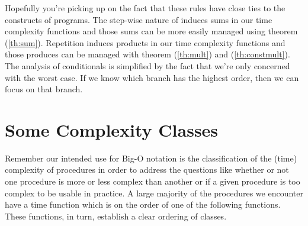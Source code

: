 \documentclass[]{tufte-handout}
\begin{document}
Hopefully you're picking up on the fact that these rules have close ties to the constructs of programs. The step-wise nature of induces sums in our time complexity functions and those sums can be more easily managed using theorem (\ref{th:sum}). Repetition induces products in our time complexity functions and those produces can be managed with theorem (\ref{th:mult}) and (\ref{th:constmult}). The analysis of conditionals is simplified by the fact that we're only concerned with the worst case. If we know which branch has the highest order, then we can focus on that branch.

\section{Some Complexity Classes}

Remember our intended use for Big-O notation is the classification of the (time) complexity of procedures in order to address the questions like whether or not one procedure is more or less complex than another or if a given procedure is too complex to be usable in practice. A large majority of the procedures we encounter have a time function which is on the order of one of the following functions. These functions, in turn, establish a clear ordering of classes.
\end{document}
